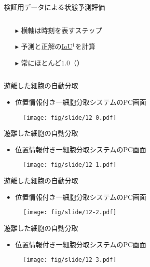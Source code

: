 \begin{frame}{検証用データによる状態予測評価}
\begin{columns}
\begin{column}{.4\linewidth}
\begin{itemize}
                \item[$\blacktriangleright$] 横軸は時刻を表すステップ
                \item[$\blacktriangleright$] 予測と正解の\uline{IoU}$^1$を計算
                \item[$\blacktriangleright$] 常にほとんど$1.0$（）
            \end{itemize}
        \end{column}
    \end{columns}
    \vspace{0.5zh}
\end{frame}

\begin{frame}{遊離した細胞の自動分取}
    \begin{itemize}
        \item 位置情報付き一細胞分取システムのPC画面
    \end{itemize}
    \begin{figure}[t]
        \centering
        \texttt{[image: fig/slide/12-0.pdf]}
    \end{figure}
\end{frame}
\begin{frame}[noframenumbering]{遊離した細胞の自動分取}
    \begin{itemize}
        \item 位置情報付き一細胞分取システムのPC画面
    \end{itemize}
    \begin{figure}[t]
        \centering
        \texttt{[image: fig/slide/12-1.pdf]}
    \end{figure}
\end{frame}
\begin{frame}[noframenumbering]{遊離した細胞の自動分取}
    \begin{itemize}
        \item 位置情報付き一細胞分取システムのPC画面
    \end{itemize}
    \begin{figure}[t]
        \centering
        \texttt{[image: fig/slide/12-2.pdf]}
    \end{figure}
\end{frame}
\begin{frame}[noframenumbering]{遊離した細胞の自動分取}
    \begin{itemize}
        \item 位置情報付き一細胞分取システムのPC画面
    \end{itemize}
    \begin{figure}[t]
        \centering
        \texttt{[image: fig/slide/12-3.pdf]}
    \end{figure}
\end{frame}
